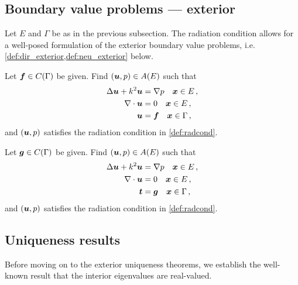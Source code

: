 \subsection{Boundary value problems --- exterior}

Let $E$ and $\Gamma$ be as in the previous subsection.
The radiation condition allows for a well-posed formulation
of the exterior boundary value problems, i.e.
\cref{def:dir_exterior,def:neu_exterior} below.

\begin{definition}
  \label{def:dir_exterior}
  Let ${\boldsymbol f} \in C(\Gamma)$ be given. Find $({\boldsymbol u},p) \in A(E)$
  such that
  \begin{equation}
  \begin{aligned} \label{eq:dir_exterior}
    \Delta {\boldsymbol u} + k^{2} {\boldsymbol u} &= \nabla p \quad {\boldsymbol x} \in E \, ,\\
    \nabla \cdot {\boldsymbol u} &= 0 \quad {\boldsymbol x} \in E \, ,  \\
    {\boldsymbol u} &= {\boldsymbol f} \quad {\boldsymbol x} \in \Gamma \, , 
  \end{aligned}
  \end{equation}
  and $({\boldsymbol u},p)$ satisfies the radiation condition in
  \cref{def:radcond}.
\end{definition}
\begin{definition}
  \label{def:neu_exterior}  
  Let ${\boldsymbol g} \in C(\Gamma)$ be given. Find $({\boldsymbol u},p) \in A(E)$
  such that
  \begin{equation}
  \begin{aligned} \label{eq:neu_exterior}
    \Delta {\boldsymbol u} + k^{2} {\boldsymbol u} &= \nabla p \quad {\boldsymbol x} \in E \, ,\\
    \nabla \cdot {\boldsymbol u} &= 0 \quad {\boldsymbol x} \in E \, ,  \\
    {\boldsymbol t} &= {\boldsymbol g} \quad {\boldsymbol x} \in \Gamma \, ,
  \end{aligned}
  \end{equation}
  and $({\boldsymbol u},p)$ satisfies the radiation condition in
  \cref{def:radcond}.
\end{definition}



\subsection{Uniqueness results}

Before moving on to the exterior uniqueness theorems,
we establish the well-known result that
the interior eigenvalues are real-valued.

